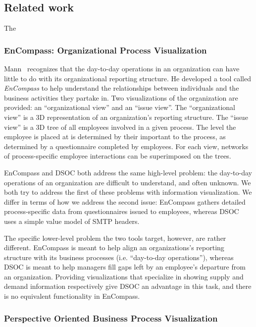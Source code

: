 \documentclass[journal]{vgtc}                %
\begin{document}
\subsection{Related work}

The

\subsubsection{EnCompass: Organizational Process Visualization}

Mann~\cite{mann1999organizational} recognizes that the day-to-day operations in an organization can have little to do with its organizational reporting structure. He developed a tool called \emph{EnCompass} to help understand the relationships between individuals and the business activities they partake in. Two visualizations of the organization are provided: an ``organizational view'' and an ``issue view''. The ``organizational view'' is a 3D representation of an organization's reporting structure. The ``issue view'' is a 3D tree of all employees involved in a given process. The level the employee is placed at is determined by their important to the process, as determined by a questionnaire completed by employees. For each view, networks of process-specific employee interactions can be superimposed on the trees.

EnCompass and DSOC both address the same high-level problem: the day-to-day operations of an organization are difficult to understand, and often unknown. We both try to address the first of these problems with information visualization. We differ in terms of how we address the second issue: EnCompass gathers detailed process-specific data from questionnaires issued to employees, whereas DSOC uses a simple value model of SMTP headers.

The specific lower-level problem the two tools target, however, are rather different. EnCompass is meant to help align an organizations's reporting structure with its business processes (i.e. ``day-to-day operations''), whereas DSOC is meant to help managers fill gaps left by an employee's departure from an organization. Providing visualizations that specialize in showing supply and demand information respectively give DSOC an advantage in this task, and there is no equivalent functionality in EnCompass.

\subsubsection{Perspective Oriented Business Process Visualization}
\end{document}
